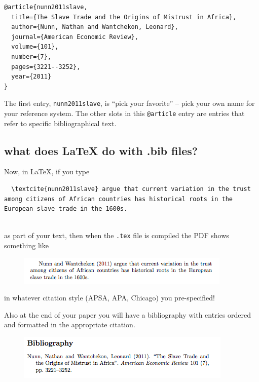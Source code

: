 \documentclass[]{book}
\theoremstyle{definition}
\theoremstyle{definition}
\theoremstyle{definition}
\theoremstyle{remark}
\begin{document}
\begin{verbatim}
@article{nunn2011slave,
  title={The Slave Trade and the Origins of Mistrust in Africa},
  author={Nunn, Nathan and Wantchekon, Leonard},
  journal={American Economic Review},
  volume={101},
  number={7},
  pages={3221--3252},
  year={2011}
}
\end{verbatim}

The first entry, \texttt{nunn2011slave}, is ``pick your favorite'' --
pick your own name for your reference system. The other slots in this
\texttt{@article} entry are entries that refer to specific
bibliographical text.

\subsection{what does LaTeX do with .bib
files?}\label{what-does-latex-do-with-.bib-files}

Now, in LaTeX, if you type

\begin{verbatim}
  \textcite{nunn2011slave} argue that current variation in the trust among citizens of African countries has historical roots in the European slave trade in the 1600s.
  
\end{verbatim}

as part of your text, then when the \texttt{.tex} file is compiled the
PDF shows something like

\begin{figure}
\centering
\includegraphics{biblatex_inline.png}
\caption{}
\end{figure}

in whatever citation style (APSA, APA, Chicago) you pre-specified!

Also at the end of your paper you will have a bibliography with entries
ordered and formatted in the appropriate citation.

\begin{figure}
\centering
\includegraphics{biblatex_bibliography.png}
\caption{}
\end{figure}
\end{document}
